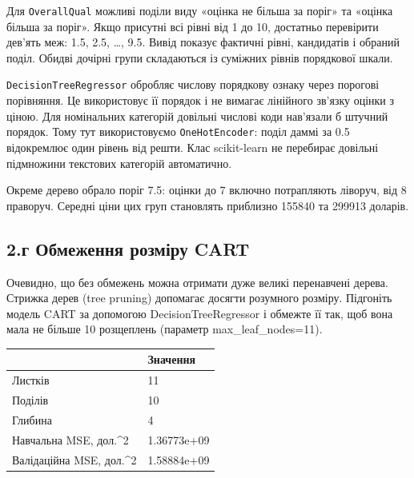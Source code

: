 
\Needspace{46.8pt}


\answerheading
Для \texttt{OverallQual} можливі поділи виду «оцінка не більша за поріг»
та «оцінка більша за поріг». Якщо присутні всі рівні від 1 до 10,
достатньо перевірити дев'ять меж: 1.5, 2.5, \ldots, 9.5. Вивід показує
фактичні рівні, кандидатів і обраний поділ. Обидві дочірні групи
складаються із суміжних рівнів порядкової шкали.

\texttt{DecisionTreeRegressor} обробляє числову порядкову ознаку через
порогові порівняння. Це використовує її порядок і не вимагає лінійного
зв'язку оцінки з ціною. Для номінальних категорій довільні числові коди
нав'язали б штучний порядок. Тому тут використовуємо
\texttt{OneHotEncoder}: поділ даммі за 0.5 відокремлює один рівень від
решти. Клас scikit-learn не перебирає довільні підмножини текстових
категорій автоматично.

Окреме дерево обрало поріг 7.5: оцінки до 7 включно потрапляють ліворуч,
від 8 праворуч. Середні ціни цих груп становлять приблизно 155840 та
299913 доларів.


\Needspace{332pt}

\subsection{2.г Обмеження розміру CART}

\begin{taskstatement}Очевидно, що без обмежень можна отримати дуже великі перенавчені дерева.
Стрижка дерев (tree pruning) допомагає досягти розумного розміру.
Підгоніть модель CART за допомогою DecisionTreeRegressor і обмежте її
так, щоб вона мала не більше 10 розщеплень (параметр
max\_leaf\_nodes=11).
\end{taskstatement}


\Needspace{95pt}
\begingroup\fontsize{7.5}{9.5}\selectfont\setlength{\tabcolsep}{2.5mm}\renewcommand{\arraystretch}{1.12}\par\noindent\begin{tabular}{|ll|}
\hline
 & Значення \\
\hline
Листків & 11 \\
Поділів & 10 \\
Глибина & 4 \\
Навчальна MSE, дол.\textasciicircum{}2 & 1.36773e+09 \\
Валідаційна MSE, дол.\textasciicircum{}2 & 1.58884e+09 \\
\hline
\end{tabular}
\par\endgroup


